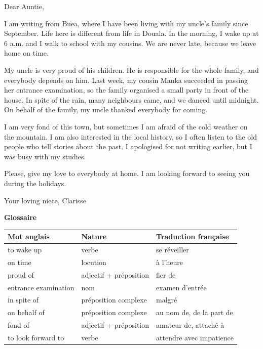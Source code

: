 \documentclass[11pt]{article}
\begin{document}
\begin{textebox}
Dear Auntie,

I am writing from Buea, where I have been living with my uncle's family since September. Life here is different from life in Douala. In the morning, I wake up at 6 a.m. and I walk to school with my cousins. We are never late, because we leave home on time.

My uncle is very proud of his children. He is responsible for the whole family, and everybody depends on him. Last week, my cousin Manka succeeded in passing her entrance examination, so the family organised a small party in front of the house. In spite of the rain, many neighbours came, and we danced until midnight. On behalf of the family, my uncle thanked everybody for coming.

I am very fond of this town, but sometimes I am afraid of the cold weather on the mountain. I am also interested in the local history, so I often listen to the old people who tell stories about the past. I apologised for not writing earlier, but I was busy with my studies.

Please, give my love to everybody at home. I am looking forward to seeing you during the holidays.

Your loving niece,
Clarisse
\end{textebox}

\textbf{Glossaire}

\begin{center}
\begin{tabularx}{\linewidth}{|l|l|X|}
\hline
\rowcolor{popblueL} Mot anglais & Nature & Traduction française \\
\hline
to wake up & verbe & se réveiller \\
\hline
on time & locution & à l'heure \\
\hline
proud of & adjectif + préposition & fier de \\
\hline
entrance examination & nom & examen d'entrée \\
\hline
in spite of & préposition complexe & malgré \\
\hline
on behalf of & préposition complexe & au nom de, de la part de \\
\hline
fond of & adjectif + préposition & amateur de, attaché à \\
\hline
to look forward to & verbe & attendre avec impatience \\
\hline
\end{tabularx}
\end{center}
\end{document}
